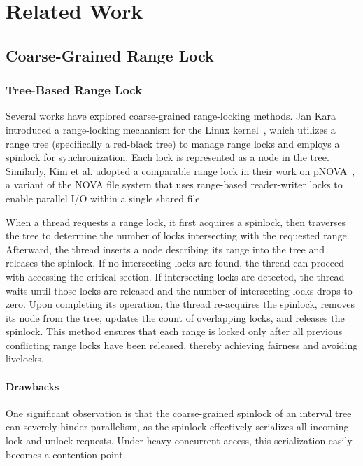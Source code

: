 \chapter{Related Work}\label{chapter:relatedwork}

\section{Coarse-Grained Range Lock}

\subsection{Tree-Based Range Lock}\label{subsec:treebased}

Several works have explored coarse-grained range-locking methods. Jan Kara introduced a range-locking mechanism for the Linux kernel~\parencite{linuxRangeLockImpl2013}, which utilizes a range tree (specifically a red-black tree) to manage range locks and employs a spinlock for synchronization. Each lock is represented as a node in the tree. Similarly, Kim et al. adopted a comparable range lock in their work on pNOVA~\parencite{kim2019pnova}, a variant of the NOVA file system that uses range-based reader-writer locks to enable parallel I/O within a single shared file.

When a thread requests a range lock, it first acquires a spinlock, then traverses the tree to determine the number of locks intersecting with the requested range. Afterward, the thread inserts a node describing its range into the tree and releases the spinlock. If no intersecting locks are found, the thread can proceed with accessing the critical section. If intersecting locks are detected, the thread waits until those locks are released and the number of intersecting locks drops to zero. Upon completing its operation, the thread re-acquires the spinlock, removes its node from the tree, updates the count of overlapping locks, and releases the spinlock. This method ensures that each range is locked only after all previous conflicting range locks have been released, thereby achieving fairness and avoiding livelocks.

\subsubsection*{Drawbacks}

One significant observation is that the coarse-grained spinlock of an interval tree can severely hinder parallelism, as the spinlock effectively serializes all incoming lock and unlock requests. Under heavy concurrent access, this serialization easily becomes a contention point.

